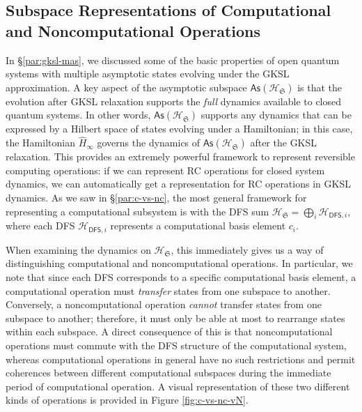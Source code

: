 \documentclass[preprints,article,accept,moreauthors,pdftex]{Definitions/mdpi}
\begin{document}
\begin{paracol}{2}
\subsection{Subspace Representations of Computational and Noncomputational Operations}
\label{ssec:rc-op-rep}
In \S\ref{par:gksl-mas}, we discussed some of the basic properties of open quantum systems with multiple asymptotic states evolving under the GKSL approximation. A key aspect of the asymptotic subspace $\mathsf{As}\left(\mathcal{H}_{\mathfrak{S}}\right)$ is that the evolution after GKSL relaxation supports the \emph{full} dynamics available to closed quantum systems. In other words, $\mathsf{As}\left(\mathcal{H}_{\mathfrak{S}}\right)$ supports any dynamics that can be expressed by a Hilbert space of states evolving under a Hamiltonian; in this case, the Hamiltonian $\widehat{H}_{\infty}$ governs the dynamics of $\mathsf{As}\left(\mathcal{H}_{\mathfrak{S}}\right)$ after the GKSL relaxation. This provides an extremely powerful framework to represent reversible computing operations: if we can represent RC operations for closed system dynamics, we can automatically get a representation for RC operations in GKSL dynamics. As we saw in \S\ref{par:c-vs-nc}, the most general framework for representing a computational subsystem is with the DFS sum $\mathcal{H}_{\mathfrak{S}} = \bigoplus_{i}\mathcal{H}_{\mathsf{DFS},i}$, where each DFS $\mathcal{H}_{\mathsf{DFS},i}$ represents a computational basis element $c_{i}$.

When examining the dynamics on $\mathcal{H}_{\mathfrak{S}}$, this immediately gives us a way of distinguishing computational and noncomputational operations. In particular, we note that since each DFS corresponds to a specific computational basis element, a computational operation must \emph{transfer} states from one subspace to another. Conversely, a noncomputational operation \emph{cannot} transfer states from one subspace to another; therefore, it must only be able at most to rearrange states within each subspace. A direct consequence of this is that noncomputational operations must commute with the DFS structure of the computational system, whereas computational operations in general have no such restrictions and permit coherences between different computational subspaces during the immediate period of computational operation. A visual representation of these two different kinds of operations is provided in Figure \ref{fig:c-vs-nc-vN}.


\end{paracol}
\end{document}
